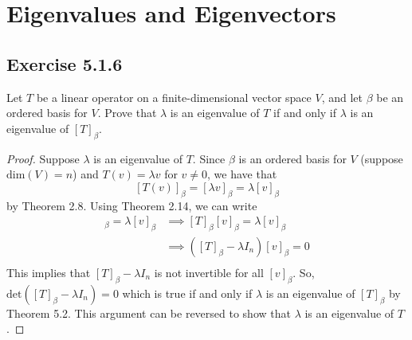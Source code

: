 \section{Eigenvalues and Eigenvectors}

\subsection*{Exercise 5.1.6} Let \( T  \) be a linear operator on a finite-dimensional vector space \( V  \), and let \( \beta  \) be an ordered basis for \( V  \). Prove that \( \lambda  \) is an eigenvalue of \( T  \) if and only if \( \lambda  \) is an eigenvalue of \( [T]_{\beta} \).
\begin{proof}
Suppose \( \lambda  \) is an eigenvalue of \( T  \). Since \( \beta  \) is an ordered basis for \( V  \) (suppose \( \text{dim}(V) = n  \)) and \( T(v) = \lambda v  \) for \( v \neq 0  \), we have that
\[ [T(v)]_{\beta} =  [\lambda v ]_{\beta} = \lambda [v]_{\beta}  \]
by Theorem 2.8. Using Theorem 2.14, we can write 
\begin{align*}
    [T(v)]_{\beta } = \lambda [v]_{\beta} &\implies [T]_{\beta } [v]_{\beta } = \lambda [v]_{\beta}  \\
                                          &\implies ([T]_{\beta} - \lambda {I}_{n}) [v]_{\beta} = 0 \\
\end{align*}
This implies that \( [T]_{\beta} - \lambda {I}_{n} \) is not invertible for all \( [v]_{\beta} \). So, \( \text{det}([T]_{\beta} - \lambda {I}_{n}) = 0  \) which is true if and only if \( \lambda  \) is an eigenvalue of \( [T]_{\beta} \) by Theorem 5.2. This argument can be reversed to show that \( \lambda  \) is an eigenvalue of \( T  \).
\end{proof}

